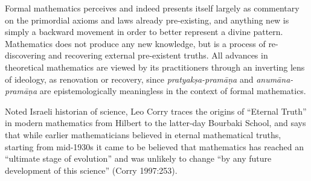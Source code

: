 Formal mathematics perceives and indeed presents itself largely as commentary on the primordial axioms and laws already pre-existing, and anything new is simply a backward movement in order to better represent a divine pattern. Mathematics does not produce any new knowledge, but is a process of re-discovering and recovering external pre-existent truths. All advances in theoretical mathematics are viewed by its practitioners through an inverting lens of ideology, as renovation or recovery, since {\sl pratyakṣa-pramāṇa} and {\sl anumāna-pramāṇa} are epistemologically meaningless in the context of formal mathematics. 

Noted Israeli historian of science, Leo Corry traces the origins of ``Eternal Truth'' in modern mathematics from Hilbert to the latter-day Bourbaki School, and says that while earlier mathematicians believed in eternal mathematical truths, starting from mid-1930s it came to be believed that mathematics has reached an “ultimate stage of evolution” and was unlikely to change “by any future development of this science” (Corry 1997:253).

